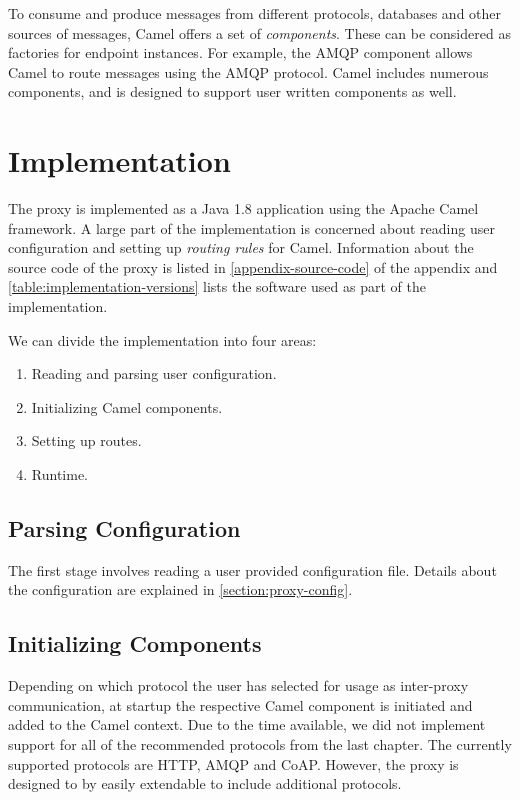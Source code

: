 To consume and produce messages from different protocols, databases and other
sources of messages, Camel offers a set of \textit{components}. These
can be considered as factories for endpoint instances. For example, the AMQP
component allows Camel to route messages using the AMQP protocol. Camel includes
numerous components, and is designed to support user written components as well.


\section{Implementation}

The proxy is implemented as a Java 1.8 application using the Apache Camel
framework. A large part of the implementation is concerned about reading user
configuration and setting up \textit{routing rules} for Camel. Information about
the source code of the proxy is listed in \cref{appendix-source-code} of the
appendix and \cref{table:implementation-versions} lists the software used as
part of the implementation.

We can divide the implementation into four areas:

\begin{enumerate}
    \item Reading and parsing user configuration.
    \item Initializing Camel components.
    \item Setting up routes.
    \item Runtime.
\end{enumerate}

\subsection{Parsing Configuration}

The first stage involves reading a user provided configuration file. Details
about the configuration are explained in \cref{section:proxy-config}.

\subsection{Initializing Components}

Depending on which protocol the user has selected for usage as inter-proxy
communication, at startup the respective Camel component is initiated and added
to the Camel context. Due to the time available, we did not implement support for all of the
recommended protocols from the last chapter. The currently supported protocols
are HTTP, AMQP and CoAP. However, the proxy is designed to by easily extendable to
include additional protocols.

